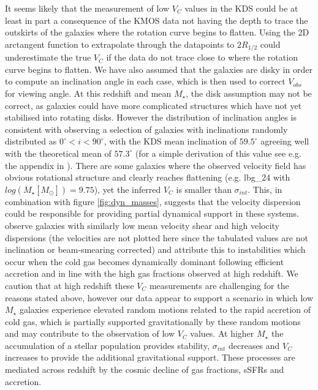 \documentclass[fleqn,usenatbib]{mn2e}
\begin{document}
It seems likely that the measurement of low $V_{C}$ values in the KDS could be at least in part a consequence of the KMOS data not having the depth to trace the outskirts of the galaxies where the rotation curve begins to flatten.
Using the 2D arctangent function to extrapolate through the datapoints to $2R_{1/2}$ could underestimate the true $V_{C}$ if the data do not trace close to where the rotation curve begins to flatten.
We have also assumed that the galaxies are disky in order to compute an inclination angle in each case, which is then used to correct $V_{obs}$ for viewing angle.
At this redshift and mean $M_{\star}$, the disk assumption may not be correct, as galaxies could have more complicated structures which have not yet stabilised into rotating disks.
However the distribution of inclination angles is consistent with observing a selection of galaxies with inclinations randomly distributed as $0^{\circ} < i < 90^{\circ}$, with the KDS mean inclination of $59.5^{\circ}$ agreeing well with the theoretical mean of $57.3^{\circ}$ (for a simple derivation of this value see e.g. the appendix in \cite{Law2009}).
There are some galaxies where the observed velocity field has obvious rotational structure and clearly reaches flattening (e.g. lbg\_24 with $log(M_{\star}[M_{\odot}])=9.75$), yet the inferred $V_{C}$ is smaller than $\sigma_{int}$.
This, in combination with figure \ref{fig:dyn_masses}, suggests that the velocity dispersion could be responsible for providing partial dynamical support in these systems.
\cite{Law2009} observe galaxies with similarly low mean velocity shear and high velocity dispersions (the velocities are not plotted here since the tabulated values are not inclination or beam-smearing corrected) and attribute this to instabilities which occur when the cold gas becomes dynamically dominant following efficient accretion and in line with the high gas fractions observed at high redshift. 
We caution that at high redshift these $V_{C}$ measurements are challenging for the reasons stated above, however our data appear to support a scenario in which low $M_{\star}$ galaxies experience elevated random motions related to the rapid accretion of cold gas, which is partially supported gravitationally by these random motions and may contribute to the observation of low $V_{C}$ values.
At higher $M_{\star}$ the accumulation of a stellar population provides stability, $\sigma_{int}$ decreases and $V_{C}$ increases to provide the additional gravitational support.
These processes are mediated across redshift by the cosmic decline of gas fractions, sSFRs and accretion. 
\end{document}

